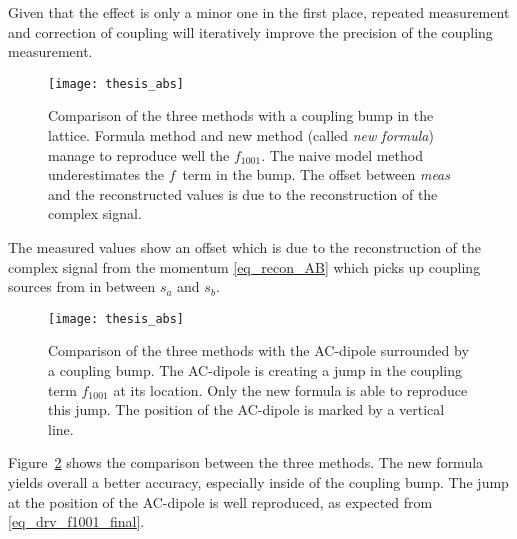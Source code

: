 Given that the effect is only a minor one in the first place, repeated measurement and correction of
coupling will iteratively improve the precision of the coupling measurement.
%
\begin{figure}[h]
  \centering
  \texttt{[image: thesis\_abs]}
  \caption{Comparison of the three methods with a coupling bump in the lattice.
    Formula method and new method (called \emph{new formula}) manage to reproduce well the $f_{1001}$.
    The naive model method underestimates the $f$~term in the bump.
    The offset between \emph{meas} and the reconstructed values is due to the reconstruction
    of the complex signal.
  }
  \label{fig_comp_felix_ryo_ac_outside}
\end{figure}
%

The measured values show an offset which is due to the reconstruction of the complex signal from the
momentum \eqref{eq_recon_AB} which picks up coupling sources from in between $s_a$ and $s_b$.
%
\begin{figure}[h]
  \centering
  \texttt{[image: thesis\_abs]}
  \caption{Comparison of the three methods with the AC-dipole surrounded by a coupling bump.
    The AC-dipole is creating a jump in the coupling term $f_{1001}$ at its location. Only the new
    formula is able to reproduce this jump. The position of the AC-dipole is marked by a vertical
    line.
  }
  \label{fig_comp_felix_ryo}
\end{figure}
%

Figure~\ref{fig_comp_felix_ryo} shows the comparison between the three methods.
The new formula yields overall a better accuracy, especially inside of the coupling bump.
The jump at the position of the AC-dipole is well reproduced, as expected from \eqref{eq_drv_f1001_final}.

